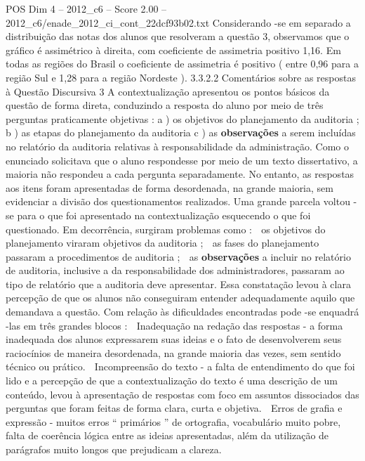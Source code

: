 \begin{textsample}{POS Dim 4 – 2012\_c6 – Score 2.00 – 2012\_c6/enade\_2012\_ci\_cont\_22dcf93b02.txt}
Considerando -se em separado a distribuição das notas dos alunos que resolveram a questão 3, observamos que o gráfico é assimétrico à direita, com coeficiente de assimetria positivo 1,16.
Em todas as regiões do Brasil o coeficiente de assimetria é positivo ( entre 0,96 para a região Sul e 1,28 para a região Nordeste ). 3.3.2.2 Comentários sobre as respostas à Questão Discursiva 3 A contextualização apresentou os pontos básicos da questão de forma direta, conduzindo a resposta do aluno por meio de três perguntas praticamente objetivas : a ) os objetivos do planejamento da auditoria ; b ) as etapas do planejamento da auditoria c ) as \textbf{observações} a serem incluídas no relatório da auditoria relativas à responsabilidade da administração.
Como o enunciado solicitava que o aluno respondesse por meio de um texto dissertativo, a maioria não respondeu a cada pergunta separadamente.
No entanto, as respostas aos itens foram apresentadas de forma desordenada, na grande maioria, sem evidenciar a divisão dos questionamentos realizados.
Uma grande parcela voltou -se para o que foi apresentado na contextualização esquecendo o que foi questionado.
Em decorrência, surgiram problemas como :  os objetivos do planejamento viraram objetivos da auditoria ;  as fases do planejamento passaram a procedimentos de auditoria ;  as \textbf{observações} a incluir no relatório de auditoria, inclusive a da responsabilidade dos administradores, passaram ao tipo de relatório que a auditoria deve apresentar.
Essa constatação levou à clara percepção de que os alunos não conseguiram entender adequadamente aquilo que demandava a questão.
Com relação às dificuldades encontradas pode -se enquadrá -las em três grandes blocos :  Inadequação na redação das respostas - a forma inadequada dos alunos expressarem suas ideias e o fato de desenvolverem seus raciocínios de maneira desordenada, na grande maioria das vezes, sem sentido técnico ou prático.  Incompreensão do texto - a falta de entendimento do que foi lido e a percepção de que a contextualização do texto é uma descrição de um conteúdo, levou à apresentação de respostas com foco em assuntos dissociados das perguntas que foram feitas de forma clara, curta e objetiva.  Erros de grafia e expressão - muitos erros “ primários ” de ortografia, vocabulário muito pobre, falta de coerência lógica entre as ideias apresentadas, além da utilização de parágrafos muito longos que prejudicam a clareza.

\end{textsample}
